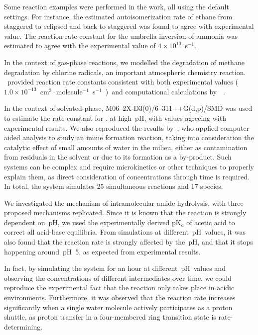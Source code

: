 Some reaction examples were performed in the work,
all using the default settings.
For instance,
the estimated autoisomerization rate of ethane from staggered to eclipsed
and back to staggered was found to agree with experimental value.
The reaction rate constant for the umbrella inversion of ammonia was estimated to agree
with the experimental value of $4 \times 10^{10}$~s$^{-1}$.

In the context of gas-phase reactions,
we modelled the degradation of methane degradation by chlorine radicals,
an important atmospheric chemistry reaction.
\linebreak
\overreact{}~provided reaction rate constants consistent with both
experimental
values
($1.0 \times 10^{-13}$~cm$^3\cdot{}$molecule$^{-1}$~s$^{-1}$~\cite{Burkholder_2020})~and computational calculations
by~\citeauthor{Tanaka_1996}~\cite{Tanaka_1996}.

In the context of solvated-phase,
M06--2X-D3(0)/6--311++G(d,p)/SMD was used to estimate the rate constant for .
at high~pH,
with values agreeing with experimental results.
We also reproduced the results by~\citeauthor{P_rez_Soto_2020},
who applied computer-aided analysis
to study an imine formation reaction,
taking into consideration the catalytic effect of small amounts of water in the milieu,
either as contamination from residuals in the solvent
or due to its formation as a by-product.
Such systems can be complex and require microkinetics or other techniques to properly explain them,
as direct consideration of concentrations through time is required.
In total,
the system simulates 25 simultaneous reactions and 17 species.

We investigated the mechanism of intramolecular amide hydrolysis,
with three proposed mechanisms replicated.
Since it is known that the reaction is strongly dependent on~pH,
we used the experimentally derived pK$_a$ of acetic acid to correct all acid-base equilibria.
From simulations at different~pH~values,
it was also found that the reaction rate is strongly affected by the~pH,
and that it stops happening around~pH~5,
as expected from experimental results.

In fact,
by simulating the system for an hour at different~pH~values
and observing the concentrations of different intermediates over time,
we could reproduce the experimental fact that
the reaction only takes place in acidic environments.
Furthermore,
it was observed that the reaction rate increases significantly when
a single water molecule actively participates as a proton shuttle,
as proton transfer in a four-membered ring transition state is rate-determining.

